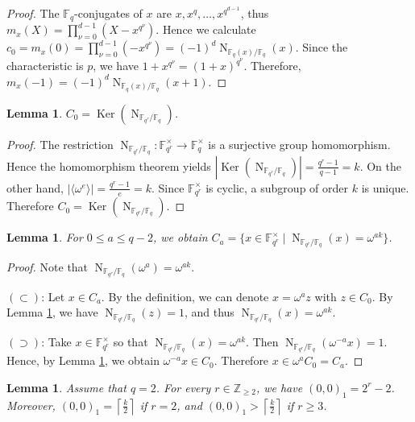 \documentclass[10pt,a4paper]{article}
\newtheorem{lem}[thm]{Lemma}
\newcommand{\Ker}{\operatorname{Ker}}
\newcommand{\Norm}{\operatorname{N}}
\numberwithin{equation}{section}
\begin{document}
\begin{proof}
The $\mathbb{F}_q$-conjugates of $x$ are $x,x^q,\dots,x^{q^{d-1}}$, thus
$m_x(X)=\prod_{\nu=0}^{d-1}(X-x^{q^\nu})$.
Hence we calculate $c_0=m_x(0)=\prod_{\nu=0}^{d-1}(-x^{q^\nu})=(-1)^d\Norm_{\mathbb{F}_q(x)/\mathbb{F}_q}(x)$. Since the characteristic is $p$, we have $1+x^{q^\nu}=(1+x)^{q^\nu}$. Therefore,
$m_x(-1)=(-1)^d\Norm_{\mathbb{F}_q(x)/\mathbb{F}_q}(x+1)$.
\end{proof}

\begin{lem}\label{lem:kernel-of-norm0}
$C_0=\Ker(\Norm_{\mathbb{F}_{q^r}/\mathbb{F}_q})$.
\end{lem}

\begin{proof}
The restriction
$\Norm_{\mathbb{F}_{q^r}/\mathbb{F}_q}:\mathbb{F}_{q^r}^{\times}\to\mathbb{F}_q^{\times}$
is a surjective group homomorphism. Hence the homomorphism theorem yields $|\Ker(\Norm_{\mathbb{F}_{q^r}/\mathbb{F}_q})|=\frac{q^{r}-1}{q-1}=k$. On the other hand, $|\langle \omega^e\rangle|=\frac{q^{r}-1}{e}=k$. Since $\mathbb{F}_{q^r}^\times$ is cyclic, a subgroup of order $k$ is unique. Therefore $C_0=\Ker(\Norm_{\mathbb{F}_{q^r}/\mathbb{F}_q})$.
\end{proof}

\begin{lem}\label{lem:kernel-general-coset}
For $0\le a\le q-2$, we obtain
$C_a=\{x\in \mathbb{F}_{q^r}^\times\mid \Norm_{\mathbb{F}_{q^r}/\mathbb{F}_q}(x)=\omega^{ak}\}$.
\end{lem}

\begin{proof}
Note that $\Norm_{\mathbb{F}_{q^r}/\mathbb{F}_q}(\omega^a)=\omega^{ak}$.

\noindent$(\subset)$: Let $x\in C_a$. By the definition, we can denote $x=\omega^a z$ with $z\in C_0$. By Lemma \ref{lem:kernel-of-norm0}, we have $\Norm_{\mathbb{F}_{q^r}/\mathbb{F}_q}(z)=1$, and thus $\Norm_{\mathbb{F}_{q^r}/\mathbb{F}_q}(x)=\omega^{ak}$.

\noindent$(\supset)$: Take $x\in \mathbb{F}_{q^r}^\times$ so that $\Norm_{\mathbb{F}_{q^r}/\mathbb{F}_q}(x)=\omega^{ak}$. Then $\Norm_{\mathbb{F}_{q^r}/\mathbb{F}_q}(\omega^{-a}x)=1$. Hence, by Lemma \ref{lem:kernel-of-norm0}, we obtain $\omega^{-a}x\in C_0$. Therefore $x\in \omega^a C_0=C_a$.
\end{proof}

\begin{lem}\label{lem:q2-general-order1}
Assume that $q=2$. For every $r\in \mathbb{Z}_{\ge 2}$, we have $(0,0)_1=2^r-2$. Moreover, $(0,0)_1=\left\lceil \frac{k}{2}\right\rceil$ if $r=2$, and $(0,0)_1>\left\lceil \frac{k}{2}\right\rceil$ if $r\ge 3$.
\end{lem}
\end{document}
